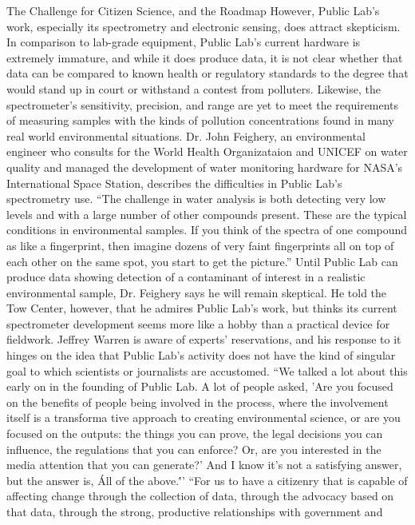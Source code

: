 The Challenge for Citizen Science, and the Roadmap
However, Public Lab's work, especially its spectrometry and electronic
sensing, does attract skepticism. In comparison to lab-grade equipment,
Public Lab's current hardware is extremely immature, and while it does
produce data, it is not clear whether that data can be compared to known
health or regulatory standards to the degree that would stand up in court or
withstand a contest from polluters. Likewise, the spectrometer's sensitivity,
precision, and range are yet to meet the requirements of measuring samples
with the kinds of pollution concentrations found in many real world environmental
situations.
Dr. John Feighery, an environmental engineer who consults for the World
Health Organizataion and UNICEF on water quality and managed the
development of water monitoring hardware for NASA's International Space
Station, describes the difficulties in Public Lab's spectrometry use. ``The
challenge in water analysis is both detecting very low levels and with a large
number of other compounds present. These are the typical conditions in
environmental samples. If you think of the spectra of one compound as
like a fingerprint, then imagine dozens of very faint fingerprints all on top
of each other on the same spot, you start to get the picture.'' Until Public
Lab can produce data showing detection of a contaminant of interest in a
realistic environmental sample, Dr. Feighery says he will remain skeptical.
He told the Tow Center, however, that he admires Public Lab's work, but
thinks its current spectrometer development seems more like a hobby than
a practical device for fieldwork.
Jeffrey Warren is aware of experts' reservations, and his response to it hinges
on the idea that Public Lab's activity does not have the kind of singular goal
to which scientists or journalists are accustomed.
``We talked a lot about this early on in the founding of Public Lab. A
lot of people asked, 'Are you focused on the benefits of people being
involved in the process, where the involvement itself is a transforma
tive approach to creating environmental science, or are you focused
on the outputs: the things you can prove, the legal decisions you can
influence, the regulations that you can enforce? Or, are you interested
in the media attention that you can generate?' And I know it's
not a satisfying answer, but the answer is, \'All of the above.\'''
``For us to have a citizenry that is capable of affecting change through
the collection of data, through the advocacy based on that data,
through the strong, productive relationships with government and
